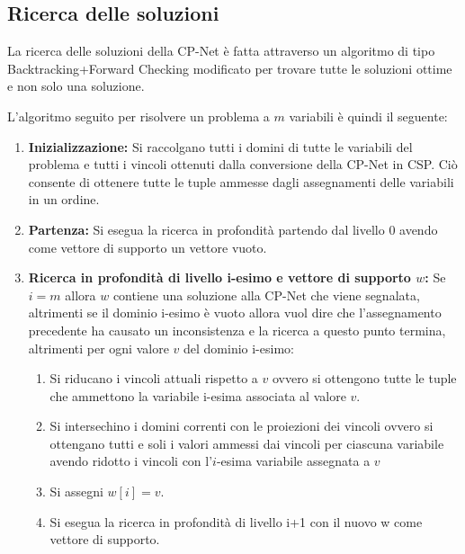 \subsection{Ricerca delle soluzioni}
La ricerca delle soluzioni della CP-Net è fatta attraverso un
algoritmo di tipo Backtracking+Forward Checking modificato per trovare
tutte le soluzioni ottime e non solo una soluzione.

L'algoritmo seguito per risolvere un problema a $m$ variabili è quindi
il seguente:
\begin{enumerate}
\item \textbf{Inizializzazione:} Si raccolgano tutti i domini di tutte
  le variabili del problema e tutti i vincoli ottenuti dalla
  conversione della CP-Net in CSP. Ciò consente di ottenere tutte le
  tuple ammesse dagli assegnamenti delle variabili in un ordine.
\item \textbf{Partenza:} Si esegua la ricerca in profondità partendo
  dal livello 0 avendo come vettore di supporto un vettore vuoto.
\item \textbf{Ricerca in profondità di livello i-esimo e vettore di
    supporto $w$:} Se $i=m$ allora $w$ contiene una soluzione alla
  CP-Net che viene segnalata, altrimenti se il dominio i-esimo è vuoto
  allora vuol dire che l'assegnamento precedente ha causato un
  inconsistenza e la ricerca a questo punto termina, altrimenti per
  ogni valore $v$ del dominio i-esimo:
  \begin{enumerate}
  \item Si riducano i vincoli attuali rispetto a $v$ ovvero si
    ottengono tutte le tuple che ammettono la variabile i-esima
    associata al valore $v$.
  \item Si intersechino i domini correnti con le proiezioni dei
    vincoli ovvero si ottengano tutti e soli i valori ammessi dai
    vincoli per ciascuna variabile avendo ridotto i vincoli 
    con l'$i$-esima variabile assegnata a $v$
  \item Si assegni $w[i]=v$.
  \item Si esegua la ricerca in profondità di livello i+1 con il nuovo
    w come vettore di supporto.
  \end{enumerate}
\end{enumerate}